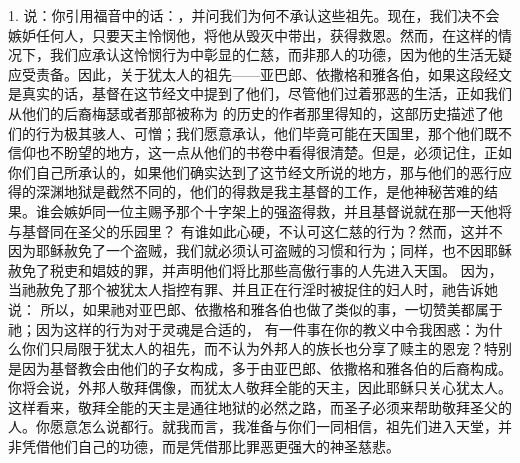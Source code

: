 1. 说：你引用福音中的话：，并问我们为何不承认这些祖先。现在，我们决不会嫉妒任何人，只要天主怜悯他，将他从毁灭中带出，获得救恩。然而，在这样的情况下，我们应承认这怜悯行为中彰显的仁慈，而非那人的功德，因为他的生活无疑应受责备。因此，关于犹太人的祖先——亚巴郎、依撒格和雅各伯，如果这段经文是真实的话，基督在这节经文中提到了他们，尽管他们过着邪恶的生活，正如我们从他们的后裔梅瑟或者那部被称为  的历史的作者那里得知的，这部历史描述了他们的行为极其骇人、可憎；我们愿意承认，他们毕竟可能在天国里，那个他们既不信仰也不盼望的地方，这一点从他们的书卷中看得很清楚。但是，必须记住，正如你们自己所承认的，如果他们确实达到了这节经文所说的地方，那与他们的恶行应得的深渊地狱是截然不同的，他们的得救是我主基督的工作，是他神秘苦难的结果。谁会嫉妒同一位主赐予那个十字架上的强盗得救，并且基督说就在那一天他将与基督同在圣父的乐园里？ 有谁如此心硬，不认可这仁慈的行为？然而，这并不因为耶稣赦免了一个盗贼，我们就必须认可盗贼的习惯和行为；同样，也不因耶稣赦免了税吏和娼妓的罪，并声明他们将比那些高傲行事的人先进入天国。 因为，当祂赦免了那个被犹太人指控有罪、并且正在行淫时被捉住的妇人时，祂告诉她说： 所以，如果祂对亚巴郎、依撒格和雅各伯也做了类似的事，一切赞美都属于祂；因为这样的行为对于灵魂是合适的， 有一件事在你的教义中令我困惑：为什么你们只局限于犹太人的祖先，而不认为外邦人的族长也分享了赎主的恩宠？特别是因为基督教会由他们的子女构成，多于由亚巴郎、依撒格和雅各伯的后裔构成。你将会说，外邦人敬拜偶像，而犹太人敬拜全能的天主，因此耶稣只关心犹太人。这样看来，敬拜全能的天主是通往地狱的必然之路，而圣子必须来帮助敬拜圣父的人。你愿意怎么说都行。就我而言，我准备与你们一同相信，祖先们进入天堂，并非凭借他们自己的功德，而是凭借那比罪恶更强大的神圣慈悲。\par

